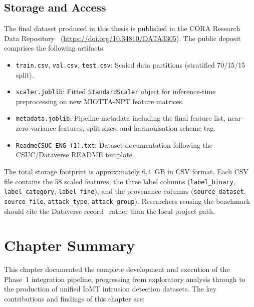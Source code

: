 \subsection{Storage and Access}
\label{subsec:storage}

The final dataset produced in this thesis is published in the CORA Research Data Repository~\cite{unified_iomt_csuc2026} (\url{https://doi.org/10.34810/DATA3305}). The public deposit comprises the following artifacts:

\begin{itemize}
    \item \texttt{train.csv}, \texttt{val.csv}, \texttt{test.csv}: Scaled data partitions (stratified 70/15/15 split).
    \item \texttt{scaler.joblib}: Fitted \texttt{StandardScaler} object for inference-time preprocessing on new MIOTTA-NPT feature matrices.
    \item \texttt{metadata.joblib}: Pipeline metadata including the final feature list, near-zero-variance features, split sizes, and harmonisation scheme tag.
    \item \texttt{ReadmeCSUC\_ENG (1).txt}: Dataset documentation following the CSUC/Dataverse README template.
\end{itemize}

The total storage footprint is approximately 6.4~GB in CSV format. Each CSV file contains the 58 scaled features, the three label columns (\texttt{label\_binary}, \texttt{label\_category}, \texttt{label\_fine}), and the provenance columns (\texttt{source\_dataset}, \texttt{source\_file}, \texttt{attack\_type}, \texttt{attack\_group}). Researchers reusing the benchmark should cite the Dataverse record~\cite{unified_iomt_csuc2026} rather than the local project path.

\section{Chapter Summary}
\label{sec:execution-summary}

This chapter documented the complete development and execution of the Phase~1 integration pipeline, progressing from exploratory analysis through to the production of unified IoMT intrusion detection datasets. The key contributions and findings of this chapter are:

